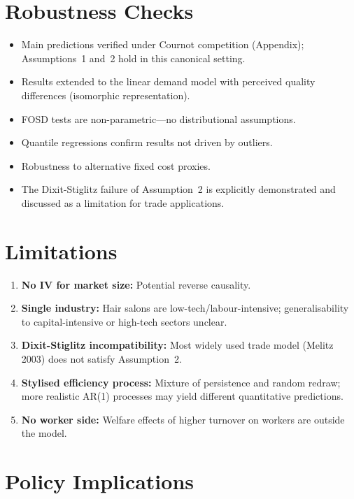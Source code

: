 \section{Robustness Checks}

\begin{itemize}
  \item Main predictions verified under Cournot competition (Appendix);
    Assumptions~1 and~2 hold in this canonical setting.
  \item Results extended to the linear demand model with perceived quality
    differences (isomorphic representation).
  \item FOSD tests are non-parametric---no distributional assumptions.
  \item Quantile regressions confirm results not driven by outliers.
  \item Robustness to alternative fixed cost proxies.
  \item The Dixit-Stiglitz failure of Assumption~2 is explicitly demonstrated
    and discussed as a limitation for trade applications.
\end{itemize}

\section{Limitations}

\begin{enumerate}
  \item \textbf{No IV for market size:} Potential reverse causality.
  \item \textbf{Single industry:} Hair salons are low-tech/labour-intensive;
    generalisability to capital-intensive or high-tech sectors unclear.
  \item \textbf{Dixit-Stiglitz incompatibility:} Most widely used trade
    model (Melitz 2003) does not satisfy Assumption~2.
  \item \textbf{Stylised efficiency process:} Mixture of persistence and
    random redraw; more realistic AR(1) processes may yield different
    quantitative predictions.
  \item \textbf{No worker side:} Welfare effects of higher turnover on
    workers are outside the model.
\end{enumerate}

\section{Policy Implications}

